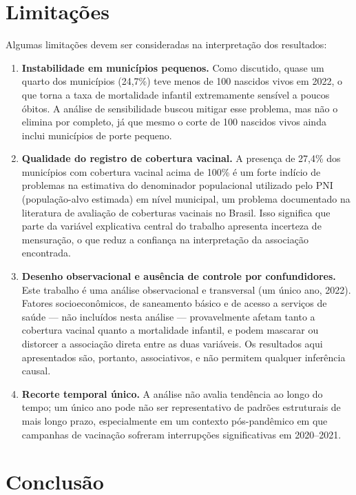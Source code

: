 \documentclass[pdflatex,sn-mathphys-num]{sn-jnl}
\begin{document}
\section{Limitações}\label{sec:limitacoes}

Algumas limitações devem ser consideradas na interpretação dos resultados:

\begin{enumerate}
\item \textbf{Instabilidade em municípios pequenos.} Como discutido, quase um quarto dos municípios (24,7\%) teve menos de 100 nascidos vivos em 2022, o que torna a taxa de mortalidade infantil extremamente sensível a poucos óbitos. A análise de sensibilidade buscou mitigar esse problema, mas não o elimina por completo, já que mesmo o corte de 100 nascidos vivos ainda inclui municípios de porte pequeno.
\item \textbf{Qualidade do registro de cobertura vacinal.} A presença de 27,4\% dos municípios com cobertura vacinal acima de 100\% é um forte indício de problemas na estimativa do denominador populacional utilizado pelo PNI (população-alvo estimada) em nível municipal, um problema documentado na literatura de avaliação de coberturas vacinais no Brasil. Isso significa que parte da variável explicativa central do trabalho apresenta incerteza de mensuração, o que reduz a confiança na interpretação da associação encontrada.
\item \textbf{Desenho observacional e ausência de controle por confundidores.} Este trabalho é uma análise observacional e transversal (um único ano, 2022). Fatores socioeconômicos, de saneamento básico e de acesso a serviços de saúde — não incluídos nesta análise — provavelmente afetam tanto a cobertura vacinal quanto a mortalidade infantil, e podem mascarar ou distorcer a associação direta entre as duas variáveis. Os resultados aqui apresentados são, portanto, associativos, e não permitem qualquer inferência causal.
\item \textbf{Recorte temporal único.} A análise não avalia tendência ao longo do tempo; um único ano pode não ser representativo de padrões estruturais de mais longo prazo, especialmente em um contexto pós-pandêmico em que campanhas de vacinação sofreram interrupções significativas em 2020--2021.
\end{enumerate}

\section{Conclusão}\label{sec:conclusao}
\end{document}

